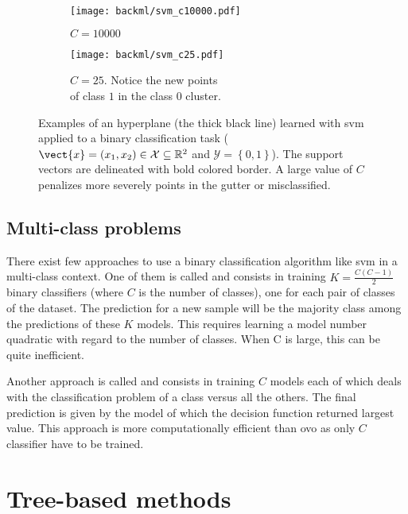 \begin{figure}
  \centering
  \begin{subfigure}[t]{0.48\textwidth}
    \centering
    \texttt{[image: backml/svm\_c10000.pdf]}
    \caption{$C=10000$}
  \end{subfigure}
  \begin{subfigure}[t]{0.48\textwidth}
    \centering
    \texttt{[image: backml/svm\_c25.pdf]}
    \caption{$C=25$. Notice the new points \\ of class $1$ in the class $0$ cluster.}
  \end{subfigure}
  \caption{Examples of an hyperplane (the thick black line) learned with \acrshort{svm} applied to a binary classification task ($\vect{x} = (x_1, x_2) \in \mathcal{X} \subseteq \mathbb{R}^2$ and $\mathcal{Y} = \left\{0, 1\right\}$). The support vectors are delineated with bold colored border. A large value of $C$ penalizes more severely points in the gutter or misclassified.}
  \label{fig:backml:svm}
\end{figure}


\subsection{Multi-class problems}

There exist few approaches to use a binary classification algorithm like
\acrshort{svm} in a multi-class context. One of them is called 
and consists in training $K=\frac{C(C-1)}{2}$ binary classifiers (where $C$ is
the number of classes), one for each pair of classes of the dataset. The prediction
for a new sample will be the majority class among the predictions of these $K$
models. This requires learning a model number quadratic with regard to the number
of classes. When C is large, this can be quite inefficient.

Another approach is called  and consists in training $C$ models
each of which deals with the classification problem of a class versus all the
others. The final prediction is given by the model of which the decision function
returned largest value. This approach is more computationally efficient than
\acrshort{ovo} as only $C$ classifier have to be trained.

\section{Tree-based methods}
\label{sec:backml:treebased}

